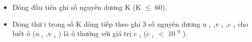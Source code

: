 \begin{itemize}
	\item Dòng đầu tiên ghi số nguyên dương K (K  $\le$  60).
	\item Dòng thứ i trong số K dòng tiếp theo ghi 3 số nguyên dương u $_ i $ ,v $_ i $ ,c $_ i $ cho biết ô (u $_ i $ ,v $_ i $ ) là ô thưởng với giá trị c $_ i $ (c $_ i $ $<$ 10 $^ 9 $ ).
\end{itemize}

\